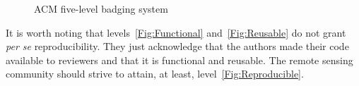 \documentclass[journal,twoside]{IEEEtran}
\begin{document}
\begin{figure}[hbt]
	\centering
	\caption{ACM five-level badging system}\label{fig:ACM-Badging}
\end{figure}

It is worth noting that levels~\ref{Fig:Functional} and~\ref{Fig:Reusable} do not grant \textit{per se} reproducibility.
They just acknowledge that the authors made their code available to reviewers and that it is functional and reusable.
The remote sensing community should strive to attain, at least, level~\ref{Fig:Reproducible}.
\end{document}
